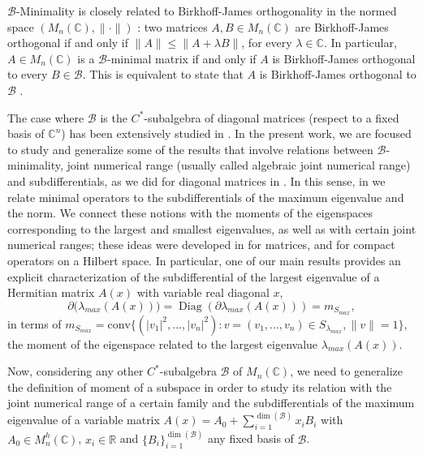 \documentclass[12pt,a4paper]{article}
\def\calB{\mathcal B}
\def\R{\mathbb R}
\def\C{\mathbb C}
\DeclareMathOperator{\Diag}{Diag}
\numberwithin{equation}{section}
\begin{document}
$\calB$-Minimality is closely related to Birkhoff-James orthogonality in the normed space $\left( M_n(\C), \|\cdot\|\right)$ \cite{Bi,James}: two matrices $A,B\in M_n(\C)$ are Birkhoff-James orthogonal if and only if $\|A\|\leq \|A+\lambda B\|$, for every $\lambda\in \C$. In particular, $A\in M_n(\C)$ is a $\calB$-minimal matrix if and only if $A$ is Birkhoff-James orthogonal to every $B\in \calB$. This is equivalent to state that $A$ is Birkhoff-James orthogonal to $\calB$ \cite{Grover, B}.

The case where $\calB$ is the $C^*$-subalgebra of diagonal matrices (respect to a fixed basis of $\C^n$) has been extensively studied in \cite{alrv, BV-2013, KV 3x3, BV-Moment, BV-SDP}. In the present work, we are focused to study and generalize some of the results that involve relations between $\calB$-minimality, joint numerical range (usually called algebraic joint numerical range) and subdifferentials, as we did for diagonal matrices in \cite{KV moment, BV-Moment, BV-SDP}. In this sense, in \cite{BV-SDP} we relate minimal operators to the subdifferentials of the maximum eigenvalue and the norm. We connect these notions with the moments of the eigenspaces corresponding to the largest and smallest eigenvalues, as well as with certain joint numerical ranges; these ideas were developed in \cite{KV moment} for matrices, and \cite{BV-Moment} for compact operators on a Hilbert space. In particular, one of our main results provides an explicit characterization of the subdifferential of the largest eigenvalue of a Hermitian matrix $A(x)$ with variable real diagonal $x$,  
\begin{equation*}
	\partial\big(\lambda_{max}(A(x))\big)=\Diag(\partial\lambda_{max}(A(x)))= m_{S_{max}},
\end{equation*}
in terms of $m_{S_{max}}=\text{conv}\{(|v_1|^2,..., |v_n|^2): v= (v_1,...,v_n)\in S_{\lambda_{max}}, \|v\|=1\}$, the moment of the eigenspace related to the largest eigenvalue $\lambda_{max}(A(x))$. 

Now, considering any other $C^*$-subalgebra $\calB$ of $M_n(\C)$, we need to generalize the definition of moment of a subspace in order to study its relation with the joint numerical range of a certain family and the subdifferentials of the maximum eigenvalue of a variable matrix $A(x)=A_0+\sum_{i=1}^{\dim(\calB)}x_iB_i$ with $A_0\in M_n^h(\C)$, $x_i\in \R$ and $\{B_i\}_{i=1}^{\dim(\calB)}$ any fixed basis of $\calB$.  
\end{document}
